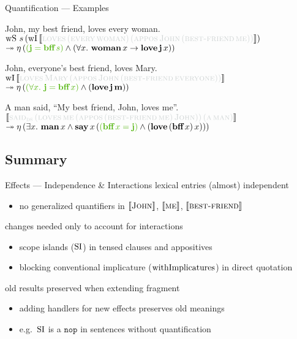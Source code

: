 \documentclass{beamer}
\begin{document}
\begin{frame}{Quantification --- Examples}

  John, my best friend, loves every woman. \\
  $\app{\wS}{s}{(\ap{\wI}{\sem{\textcolor{shady}{\app{\abs{loves}}{(\ap{\abs{every}}{\abs{woman}})}{(\app{\abs{appos}}{\abs{John}}{(\ap{\abs{best-friend}}{\abs{me}})})}}})}}$ \\
  \hfill $\tto \etaE{(\textcolor{cicolor}{(\obj{j} = \ap{\obj{bff}}{s})} \land (\forall x.\ \ap{\obj{woman}}{x} \to \app{\obj{love}}{\obj{j}}{x}))}$

  \pause
  \vfill

  John, everyone's best friend, loves Mary.
  $\ap{\wI}{\sem{\textcolor{shady}{\app{\abs{loves}}{\abs{Mary}}{(\app{\abs{appos}}{\abs{John}}{(\ap{\abs{best-friend}}{\abs{everyone}})})}}}}$ \\
  \hfill $\tto \etaE{(\textcolor{cicolor}{(\forall x.\ \obj{j} = \ap{\obj{bff}}{x})} \land (\app{\obj{love}}{\obj{j}}{\obj{m}}))}$

  \pause
  \vfill

  A man said, ``My best friend, John, loves me''.
  $\sem{\textcolor{shady}{\app{\abs{said}_{\abs{ds}}}{(\app{\abs{loves}}{\abs{me}}{(\app{\abs{appos}}{(\ap{\abs{best-friend}}{\abs{me}})}{\abs{John}})})}{(\ap{\abs{a}}{\abs{man}})}}}$ \\
  \hfill $\tto \etaE{(\exists x.\ \ap{\obj{man}}{x} \land \app{\obj{say}}{x}{(\textcolor{cicolor}{(\ap{\obj{bff}}{x} = \obj{j})} \land (\app{\obj{love}}{(\ap{\obj{bff}}{x})}{x}))})}$
\end{frame}


\subsection{Summary}

\begin{frame}{Effects --- Independence \& Interactions}
  lexical entries (almost) independent
  \begin{itemize}
  \item no generalized quantifiers in $\llbracket \textsc{John} \rrbracket$, $\llbracket \textsc{me} \rrbracket$,
    $\llbracket \textsc{best-friend} \rrbracket$
  \end{itemize}

  \pause
  \vfill

  changes needed only to account for interactions
  \begin{itemize}
  \item scope islands ($\operatorname{SI}$) in tensed clauses and appositives
  \item blocking conventional implicature ($\operatorname{withImplicatures}$) in direct
    quotation
  \end{itemize}

  \pause
  \vfill

  old results preserved when extending fragment
  \begin{itemize}
  \item adding handlers for new effects preserves old meanings
  \item e.g.\ $\operatorname{SI}$ is a $\texttt{nop}$ in sentences without quantification
  \end{itemize}
\end{frame}
\end{document}

